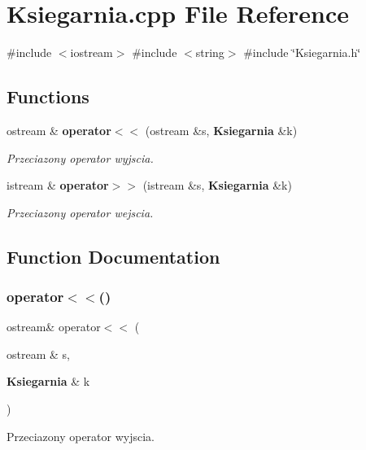 \section{Ksiegarnia.\+cpp File Reference}
\label{_ksiegarnia_8cpp}
{\ttfamily \#include $<$iostream$>$}\newline
{\ttfamily \#include $<$string$>$}\newline
{\ttfamily \#include \char`\"{}Ksiegarnia.\+h\char`\"{}}\newline
\subsection*{Functions}
\begin{DoxyCompactItemize}
\item 
ostream \& \textbf{ operator$<$$<$} (ostream \&s, \textbf{ Ksiegarnia} \&k)
\begin{DoxyCompactList}\small\item\em Przeciazony operator wyjscia. \end{DoxyCompactList}\item 
istream \& \textbf{ operator$>$$>$} (istream \&s, \textbf{ Ksiegarnia} \&k)
\begin{DoxyCompactList}\small\item\em Przeciazony operator wejscia. \end{DoxyCompactList}\end{DoxyCompactItemize}


\subsection{Function Documentation}
\mbox{\label{_ksiegarnia_8cpp_ac4466b29fbed27e8881e19c96af6236d}} 
\subsubsection{operator$<$$<$()}
{\footnotesize\ttfamily ostream\& operator$<$$<$ (\begin{DoxyParamCaption}\item[{ostream \&}]{s,  }\item[{\textbf{ Ksiegarnia} \&}]{k }\end{DoxyParamCaption})}



Przeciazony operator wyjscia. 

